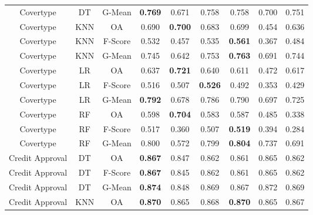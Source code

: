 \begin{longtable}{ccccccccc}
         Covertype &         DT &  G-Mean & \textbf{0.769} &          0.671 &          0.758 &          0.758 &          0.700 &          0.751 \\
         Covertype &        KNN &      OA &          0.690 & \textbf{0.700} &          0.683 &          0.699 &          0.454 &          0.636 \\
         Covertype &        KNN & F-Score &          0.532 &          0.457 &          0.535 & \textbf{0.561} &          0.367 &          0.484 \\
         Covertype &        KNN &  G-Mean &          0.745 &          0.642 &          0.753 & \textbf{0.763} &          0.691 &          0.744 \\
         Covertype &         LR &      OA &          0.637 & \textbf{0.721} &          0.640 &          0.611 &          0.472 &          0.617 \\
         Covertype &         LR & F-Score &          0.516 &          0.507 & \textbf{0.526} &          0.492 &          0.353 &          0.429 \\
         Covertype &         LR &  G-Mean & \textbf{0.792} &          0.678 &          0.786 &          0.790 &          0.697 &          0.725 \\
         Covertype &         RF &      OA &          0.598 & \textbf{0.704} &          0.583 &          0.587 &          0.485 &          0.338 \\
         Covertype &         RF & F-Score &          0.517 &          0.360 &          0.507 & \textbf{0.519} &          0.394 &          0.284 \\
         Covertype &         RF &  G-Mean &          0.800 &          0.572 &          0.799 & \textbf{0.804} &          0.737 &          0.691 \\
   Credit Approval &         DT &      OA & \textbf{0.867} &          0.847 &          0.862 &          0.861 &          0.865 &          0.862 \\
   Credit Approval &         DT & F-Score & \textbf{0.867} &          0.845 &          0.862 &          0.861 &          0.865 &          0.862 \\
   Credit Approval &         DT &  G-Mean & \textbf{0.874} &          0.848 &          0.869 &          0.867 &          0.872 &          0.869 \\
   Credit Approval &        KNN &      OA & \textbf{0.870} &          0.865 &          0.868 & \textbf{0.870} &          0.865 &          0.867 \\

\end{longtable}

